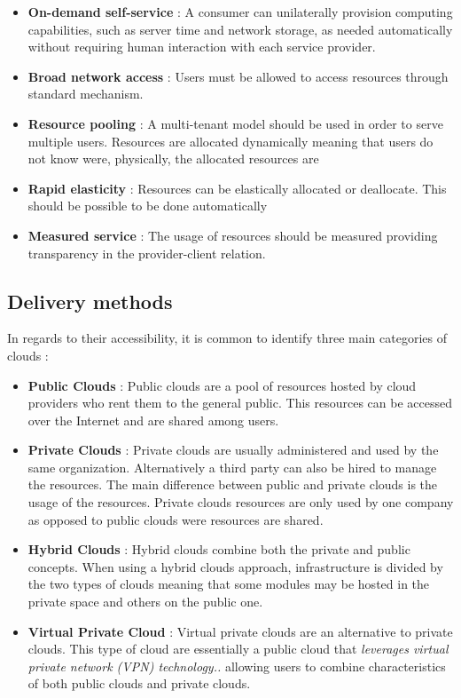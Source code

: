         \begin{itemize}
            \item \textbf{On-demand self-service} : A consumer can unilaterally provision computing capabilities, such as server time and network storage, as needed automatically without requiring human interaction with each service provider.
            \item \textbf{Broad network access} :  Users must be allowed to access resources through standard mechanism.
            \item \textbf{Resource pooling} : A multi-tenant model should be used in order to serve multiple users. Resources are allocated dynamically meaning that users do not know were, physically, the allocated resources are \cite{Garrison2012}
            \item \textbf{Rapid elasticity} : Resources can be elastically allocated or deallocate. This should be possible to be done automatically \cite{Mell2011}
            \item \textbf{Measured service} : The usage of resources should be measured providing transparency in the provider-client relation.
  	    \end{itemize}

        \subsection{Delivery methods} \label{chap:stateoftheheart:sec:cloud:sec:deliverymethods}
          In regards to their accessibility, it is common to identify three main categories of clouds \cite{Zhang2010} :
        	\begin{itemize}
            	\item \textbf{Public Clouds} : Public clouds are a pool of resources hosted by cloud providers who rent them to the general public. This resources can be accessed over the Internet and are shared among users.

    		      \item \textbf{Private Clouds} : Private clouds are usually administered and used by the same organization. Alternatively a third party can also be hired to manage the resources. The main difference between public and private clouds is the usage of the resources. Private clouds resources are only used by one company as opposed to public clouds were resources are shared.

              \item \textbf{Hybrid Clouds} : Hybrid clouds combine both the private and public concepts. When using a hybrid clouds approach, infrastructure is divided by the two types of clouds meaning that some modules may be hosted in the private space and others on the public one.

              \item \textbf{Virtual Private Cloud} : Virtual private clouds are an alternative to private clouds. This type of cloud are essentially a public cloud that \textit{leverages virtual private network (VPN) technology..}\cite{Zhang2010} allowing users to combine characteristics of both public clouds and private clouds.
    		\end{itemize}

